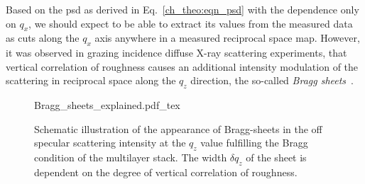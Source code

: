 Based on the \gls{psd} as derived in Eq.~\eqref{ch_theo:eqn_psd} with the dependence only on $q_x$, we should expect to be able to extract its values from the measured data as cuts along the $q_x$ axis anywhere in a measured reciprocal space map. However, it was observed in grazing incidence diffuse X-ray scattering experiments, that vertical correlation of roughness causes an additional intensity modulation of the scattering in reciprocal space along the $q_z$ direction, the so-called \emph{Bragg sheets}~\cite{jiang_nonspecular_1992, holy_nonspecular_1994, salditt_kinetic_1994, holy_interface_1995}.
\begin{figure}[htb]
    \def\svgwidth{\textwidth}
    {Bragg_sheets_explained.pdf_tex}
    \caption[Schematic illustration of the appearance of Bragg-sheets.]{Schematic illustration of the appearance of Bragg-sheets in the off specular scattering intensity at the $q_z$ value fulfilling the Bragg condition of the multilayer stack. The width $\delta q_z$ of the sheet is dependent on the degree of vertical correlation of roughness.}
    \label{ch_diff:fig_Bragg_sheets_explained} 
\end{figure}

